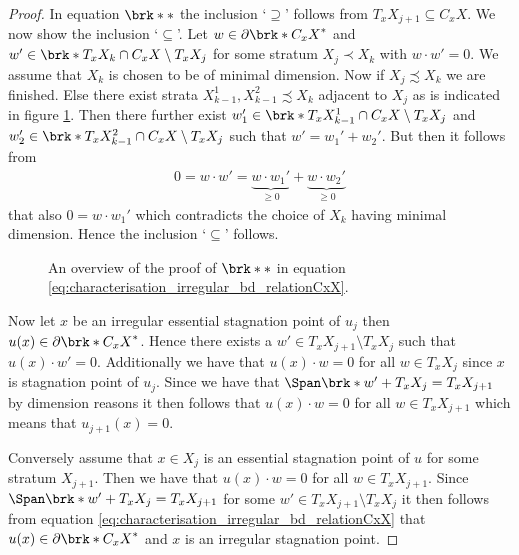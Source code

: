 \begin{proof}
  In equation $\brk*{*}$ 
  the inclusion `$\supseteq$' follows from $T_xX_{j+1}\subseteq C_xX$.
  We now show the
  inclusion `$\subseteq$'. Let $w\in \partial\brk*{C_xX}^*$ and $w'\in \brk*{T_xX_k\cap C_xX}\setminus T_xX_j$ for some stratum $X_j\prec X_k$ with $w\cdot w'=0$.
  We assume that $X_k$ is chosen to be of minimal dimension.
  Now if $X_j\precsim X_k$ we are finished. Else there exist strata $X_{k-1}^1,X_{k-1}^2\precsim X_k$
  adjacent to $X_j$ as is indicated in figure \ref{fi:irregularCPs_X123}. Then there further exist $w_1'\in \brk*{T_xX_{k-1}^1\cap C_xX}\setminus T_xX_j$ and $w_2'\in \brk*{T_xX_{k-1}^2\cap C_xX}\setminus T_xX_j$
  such that $w'=w_1'+w_2'$. But then it follows from
  \begin{align*}
    0=w\cdot w'=\underbrace{w\cdot w_1'}_{\geq0}+\underbrace{w\cdot w_2'}_{\geq0}
  \end{align*}
  that also $0=w\cdot w_1'$ which contradicts the choice of $X_k$ having minimal dimension.
  Hence the inclusion `$\subseteq$' follows.
  \begin{figure}
    \centering
    
    \caption{An overview of the proof of $\brk*{*}$ in equation \eqref{eq:characterisation_irregular_bd_relationCxX}.}
    \label{fi:irregularCPs_X123}
  \end{figure}

  Now let $x$ be an irregular essential stagnation point of $u_j$ then  $u(x)\in \partial\brk*{C_xX}^*$. Hence there
  exists a $w'\in T_xX_{j+1}\setminus T_xX_j$ such that $u(x)\cdot w'=0$. 
  Additionally we have that $u(x)\cdot w=0$ for all $w\in T_xX_j$ since $x$ is stagnation point of $u_j$.
  Since we have that
  $\Span\brk*{w'}+T_xX_j=T_xX_{j+1}$ by dimension reasons it then follows that
  $u(x)\cdot w=0$ for all $w\in T_xX_{j+1}$ which means that $u_{j+1}(x)=0$.

  Conversely assume that $x\in X_j$ is an essential stagnation point of $u$ for some stratum $X_{j+1}$. Then we have that
  $u(x)\cdot w=0$ for all $w\in T_xX_{j+1}$. Since  $\Span\brk*{w'}+T_xX_j=T_xX_{j+1}$
  for some $w'\in T_xX_{j+1}\setminus T_xX_j$
  it then follows from equation \eqref{eq:characterisation_irregular_bd_relationCxX} that $u(x)\in \partial\brk*{C_xX}^*$
  and $x$ is an irregular stagnation point.
\end{proof}
